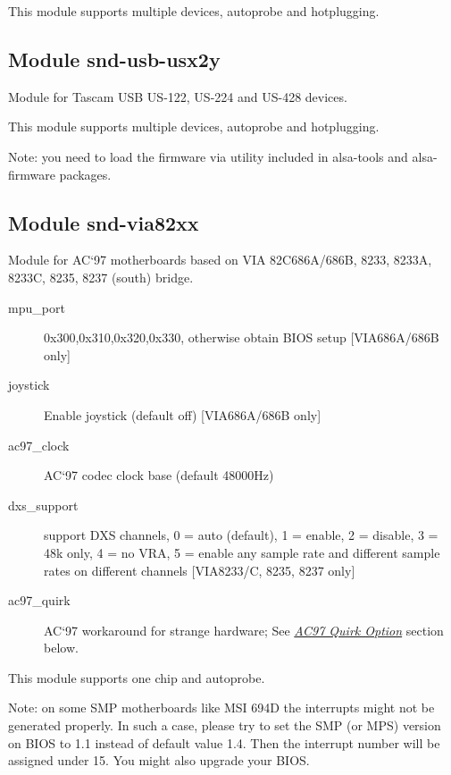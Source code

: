 \documentclass[a4paper,8pt,english]{sphinxmanual}
\begin{document}
This module supports multiple devices, autoprobe and hotplugging.


\subsection{Module snd-usb-usx2y}
\label{sound/alsa-configuration:module-snd-usb-usx2y}
Module for Tascam USB US-122, US-224 and US-428 devices.

This module supports multiple devices, autoprobe and hotplugging.

Note: you need to load the firmware via  utility included
in alsa-tools and alsa-firmware packages.


\subsection{Module snd-via82xx}
\label{sound/alsa-configuration:module-snd-via82xx}
Module for AC`97 motherboards based on VIA 82C686A/686B, 8233, 8233A,
8233C, 8235, 8237 (south) bridge.
\begin{description}
\item[{mpu\_port}] \leavevmode
0x300,0x310,0x320,0x330, otherwise obtain BIOS setup
{[}VIA686A/686B only{]}

\item[{joystick}] \leavevmode
Enable joystick (default off) {[}VIA686A/686B only{]}

\item[{ac97\_clock}] \leavevmode
AC`97 codec clock base (default 48000Hz)

\item[{dxs\_support}] \leavevmode
support DXS channels, 0 = auto (default), 1 = enable, 2 = disable,
3 = 48k only, 4 = no VRA, 5 = enable any sample rate and different
sample rates on different channels {[}VIA8233/C, 8235, 8237 only{]}

\item[{ac97\_quirk}] \leavevmode
AC`97 workaround for strange hardware;
See {\hyperref[sound/alsa\string-configuration:ac97\string-quirk\string-option]{\emph{AC97 Quirk Option}}} section below.

\end{description}

This module supports one chip and autoprobe.

Note: on some SMP motherboards like MSI 694D the interrupts might
not be generated properly.  In such a case, please try to
set the SMP (or MPS) version on BIOS to 1.1 instead of
default value 1.4.  Then the interrupt number will be
assigned under 15. You might also upgrade your BIOS.
\end{document}
